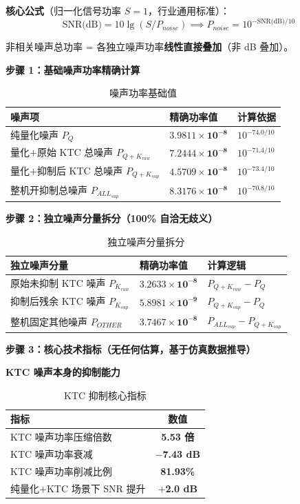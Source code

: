 \documentclass[11pt,a4paper,UTF8]{ctexart}
\begin{document}
\textbf{核心公式}（归一化信号功率 $S=1$，行业通用标准）：
$$\text{SNR(dB)} = 10\lg(S/P_{noise}) \implies P_{noise} = 10^{-\text{SNR(dB)}/10}$$

非相关噪声总功率 = 各独立噪声功率\textbf{线性直接叠加}（非 dB 叠加）。

\textbf{步骤 1：基础噪声功率精确计算}

\begin{table}[htbp]\centering\caption{噪声功率基础值}\label{tab:pnoise}\small
\begin{tabular}{lll}\toprule
\textbf{噪声项} & \textbf{精确功率值} & \textbf{计算依据} \\\midrule
纯量化噪声 $P_Q$ & $\boldsymbol{3.9811\times 10^{-8}}$ & $10^{-74.0/10}$ \\
量化$+$原始 KTC 总噪声 $P_{Q+K_{raw}}$ & $\boldsymbol{7.2444\times 10^{-8}}$ & $10^{-71.4/10}$ \\
量化$+$抑制后 KTC 总噪声 $P_{Q+K_{sup}}$ & $\boldsymbol{4.5709\times 10^{-8}}$ & $10^{-73.4/10}$ \\
整机开抑制总噪声 $P_{ALL_{sup}}$ & $\boldsymbol{8.3176\times 10^{-8}}$ & $10^{-70.8/10}$ \\\bottomrule
\end{tabular}
\end{table}

\textbf{步骤 2：独立噪声分量拆分（100\% 自洽无歧义）}

\begin{table}[htbp]\centering\caption{独立噪声分量拆分}\label{tab:split}\small
\begin{tabular}{lll}\toprule
\textbf{独立噪声分量} & \textbf{精确功率值} & \textbf{计算逻辑} \\\midrule
原始未抑制 KTC 噪声 $P_{K_{raw}}$ & $\boldsymbol{3.2633\times 10^{-8}}$ & $P_{Q+K_{raw}} - P_Q$ \\
抑制后残余 KTC 噪声 $P_{K_{sup}}$ & $\boldsymbol{5.8981\times 10^{-9}}$ & $P_{Q+K_{sup}} - P_Q$ \\
整机固定其他噪声 $P_{OTHER}$ & $\boldsymbol{3.7467\times 10^{-8}}$ & $P_{ALL_{sup}} - P_{Q+K_{sup}}$ \\\bottomrule
\end{tabular}
\end{table}

\textbf{步骤 3：核心技术指标（无任何估算，基于仿真数据推导）}

\textbf{KTC 噪声本身的抑制能力}

\begin{table}[htbp]\centering\caption{KTC 抑制核心指标}\label{tab:ktc-core}\small
\begin{tabular}{lc}\toprule
\textbf{指标} & \textbf{数值} \\\midrule
KTC 噪声功率压缩倍数 & \textbf{5.53 倍} \\
KTC 噪声功率衰减 & \textbf{$-$7.43 dB} \\
KTC 噪声功率削减比例 & \textbf{81.93\%} \\
纯量化$+$KTC 场景下 SNR 提升 & \textbf{$+$2.0 dB} \\\bottomrule
\end{tabular}
\end{table}
\end{document}
